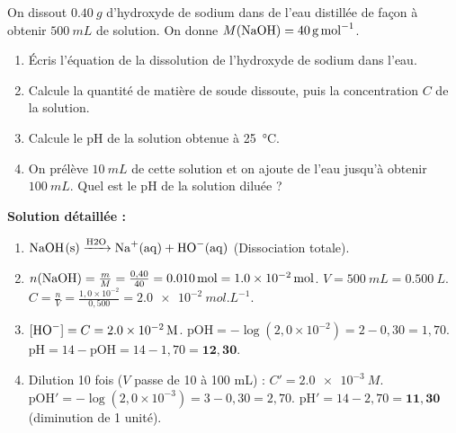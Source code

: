 \documentclass[11pt]{article}
\begin{document}
\begin{exoresolu}
On dissout $\SI{0,40}{g}$ d'hydroxyde de sodium  dans de l'eau distillée de façon à obtenir $\SI{500}{mL}$ de solution. On donne $M(\ce{NaOH}) = \SI{40}{g.mol^{-1}}$.
\begin{enumerate}
\item Écris l'équation de la dissolution de l'hydroxyde de sodium dans l'eau.
\item Calcule la quantité de matière de soude dissoute, puis la concentration $C$ de la solution.
\item Calcule le pH de la solution obtenue à \SI{25}{\celsius}.
\item On prélève $\SI{10}{mL}$ de cette solution et on ajoute de l'eau jusqu'à obtenir $\SI{100}{mL}$. Quel est le pH de la solution diluée ?
\end{enumerate}
\tcblower
\textbf{Solution détaillée :}
\begin{enumerate}
\item $\ce{NaOH(s) ->[\text{H2O}] Na+(aq) + HO-(aq)}$ (Dissociation totale).
\item $n(\ce{NaOH}) = \frac{m}{M} = \frac{0,40}{40} = \SI{0,010}{mol} = \SI{1,0e-2}{mol}$.
$V = \SI{500}{mL} = \SI{0,500}{L}$.
$C = \frac{n}{V} = \frac{1,0 \times 10^{-2}}{0,500} = \SI{2,0e-2}{mol.L^{-1}}$.
\item $[\ce{HO-}] = C = \SI{2,0e-2}{M}$.
$\mathrm{pOH} = -\log(2,0 \times 10^{-2}) = 2 - 0,30 = 1,70$.
$\mathrm{pH} = 14 - \mathrm{pOH} = 14 - 1,70 = \mathbf{12,30}$.
\item Dilution 10 fois ($V$ passe de 10 à 100 mL) : $C' = \SI{2,0e-3}{M}$.
$\mathrm{pOH}' = -\log(2,0 \times 10^{-3}) = 3 - 0,30 = 2,70$.
$\mathrm{pH}' = 14 - 2,70 = \mathbf{11,30}$ (diminution de 1 unité).
\end{enumerate}
\end{exoresolu}
\end{document}
